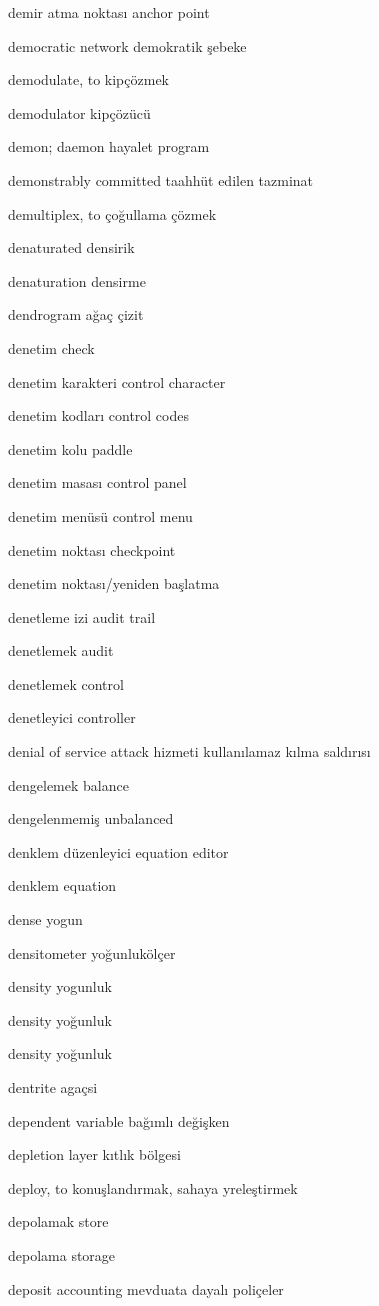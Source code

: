 \documentclass[12pt,fleqn]{article}\usepackage{../../common}
\begin{document}
demir atma noktası anchor point

democratic network demokratik şebeke

demodulate, to kipçözmek

demodulator kipçözücü

demon; daemon hayalet program

demonstrably committed taahhüt edilen tazminat

demultiplex, to çoğullama çözmek

denaturated densirik

denaturation densirme

dendrogram ağaç çizit

denetim check

denetim karakteri control character

denetim kodları control codes

denetim kolu paddle

denetim masası control panel

denetim menüsü control menu

denetim noktası checkpoint

denetim noktası/yeniden başlatma

denetleme izi audit trail

denetlemek audit

denetlemek control

denetleyici controller

denial of service attack hizmeti kullanılamaz kılma saldırısı

dengelemek balance

dengelenmemiş unbalanced

denklem düzenleyici equation editor

denklem equation

dense yogun

densitometer yoğunlukölçer

density yogunluk

density yoğunluk

density yoğunluk

dentrite agaçsi

dependent variable bağımlı değişken

depletion layer kıtlık bölgesi

deploy, to konuşlandırmak, sahaya yreleştirmek

depolamak store

depolama storage

deposit accounting mevduata dayalı poliçeler
\end{document}
